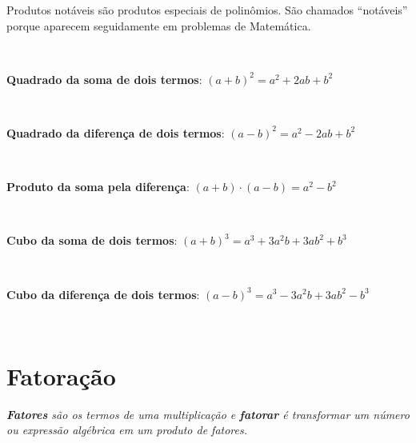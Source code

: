 Produtos notáveis são produtos especiais de polinômios. São chamados “notáveis” porque aparecem seguidamente em problemas de Matemática.

~~

\textbf{Quadrado da soma de dois termos}: $(a+b)^2 = a^2 + 2ab + b^2$

~~

\textbf{Quadrado da diferença de dois termos}: $(a - b)^2 = a^2 - 2ab + b^2$

~~

\textbf{Produto da soma pela diferença}: $(a + b) \cdot (a - b) = a^2 - b^2$

~~

\textbf{Cubo da soma de dois termos}: $(a + b)^3 = a^3 + 3a^2b + 3ab^2 + b^3$

~~

\textbf{Cubo da diferença de dois termos}: $(a - b)^3 = a^3 - 3a^2b + 3ab^2 - b^3$

~~

\begin{exercicios}
\begin{multicols}{3}
    
    
    
    
    
    
    
    
    
    
    
    
    
    
\end{multicols}
\end{exercicios}

\section{Fatoração}

\begin{caixa}

    \textit{\textbf{Fatores} são os termos de uma multiplicação e \textbf{fatorar} é transformar um número ou expressão algébrica em um produto de fatores.}
    
\end{caixa}

